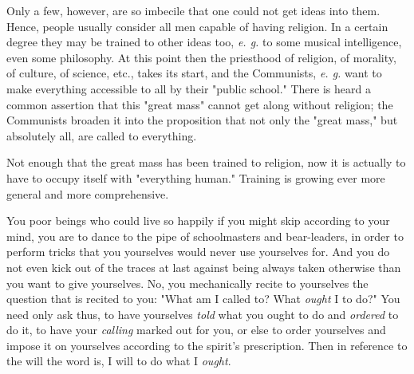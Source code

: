 Only a few, however, are so imbecile that one could not get ideas into them. 
Hence, people usually consider all men capable of having religion. In a 
certain degree they may be trained to other ideas too, \textit{e. g.} to some 
musical intelligence, even some philosophy. At this point then the priesthood 
of religion, of morality, of culture, of science, etc., takes its start, and 
the Communists, \textit{e. g.} want to make everything accessible to all by 
their "{}public school."{} There is heard a common assertion that this 
"{}great mass"{} cannot get along without religion; the Communists broaden it 
into the proposition that not only the "{}great mass,"{} but absolutely all, 
are called to everything.

Not enough that the great mass has been trained to religion, now it is 
actually to have to occupy itself with "{}everything human."{} Training is 
growing ever more general and more comprehensive.

You poor beings who could live so happily if you might skip according to your 
mind, you are to dance to the pipe of schoolmasters and bear-leaders, in order 
to perform tricks that you yourselves would never use yourselves for. And you 
do not even kick out of the traces at last against being always taken 
otherwise than you want to give yourselves. No, you mechanically recite to 
yourselves the question that is recited to you: "{}What am I called to? What 
\textit{ought} I to do?"{} You need only ask thus, to have yourselves 
\textit{told} what you ought to do and \textit{ordered} to do it, to have your 
\textit{calling} marked out for you, or else to order yourselves and impose it 
on yourselves according to the spirit's prescription. Then in reference to the 
will the word is, I will to do what I \textit{ought}.

